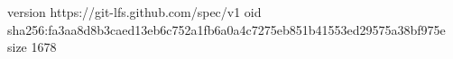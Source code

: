 version https://git-lfs.github.com/spec/v1
oid sha256:fa3aa8d8b3caed13eb6c752a1fb6a0a4c7275eb851b41553ed29575a38bf975e
size 1678
